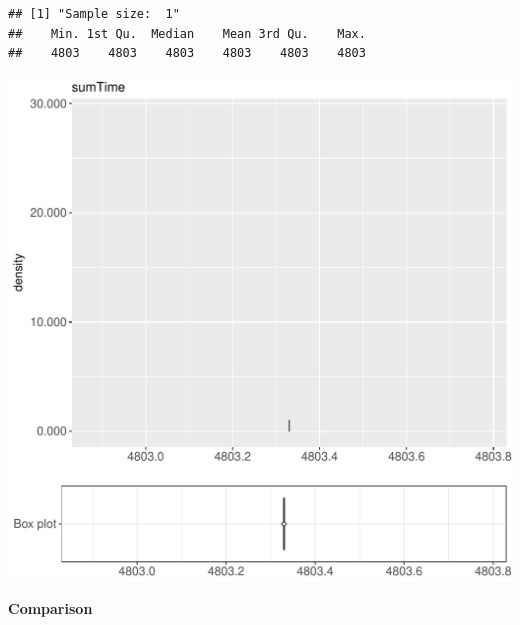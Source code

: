 \documentclass{article}\usepackage[]{graphicx}\usepackage[]{color}
\makeatletter
\def\maxwidth{ %
  \ifdim\Gin@nat@width>\linewidth
    \linewidth
  \else
    \Gin@nat@width
  \fi
}
\newenvironment{kframe}{%
 \def\at@end@of@kframe{}%
 \ifinner\ifhmode%
  \def\at@end@of@kframe{\end{minipage}}%
  \begin{minipage}{\columnwidth}%
 \fi\fi%
 \def\FrameCommand##1{\hskip\@totalleftmargin \hskip-\fboxsep
 \colorbox{shadecolor}{##1}\hskip-\fboxsep
     \hskip-\linewidth \hskip-\@totalleftmargin \hskip\columnwidth}%
 \MakeFramed {\advance\hsize-\width
   \@totalleftmargin\z@ \linewidth\hsize
   \@setminipage}}%
 {\par\unskip\endMakeFramed%
 \at@end@of@kframe}
\newenvironment{knitrout}{}{} %
\makeatother
\begin{document}
\begin{knitrout}
\color{fgcolor}\begin{kframe}
\begin{verbatim}
## [1] "Sample size:  1"
##    Min. 1st Qu.  Median    Mean 3rd Qu.    Max. 
##    4803    4803    4803    4803    4803    4803
\end{verbatim}


{\ttfamily\noindent\bfseries{}}\end{kframe}
\includegraphics[width=\maxwidth]{figure/RH1_nocache_password2-1} 

\end{knitrout}
  
 \textbf{Comparison}
  
\end{document}
